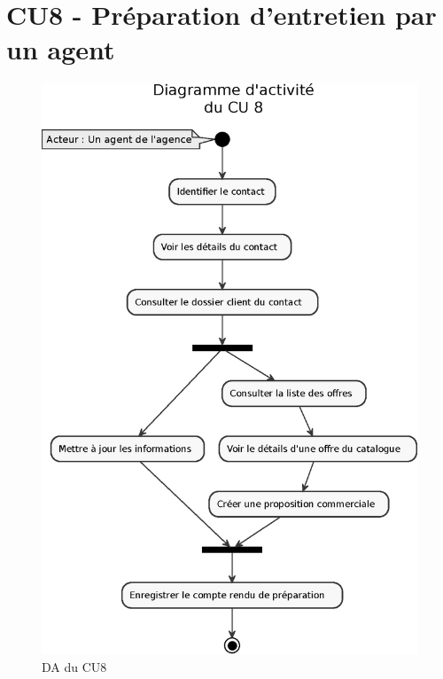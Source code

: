 \section{CU8 - Préparation d’entretien par un agent}
\begin{figure}[H]
\centering
\includegraphics[width=15cm]{figures/eps/DA_CU8.eps}
\caption{DA du CU8}
\end{figure}

